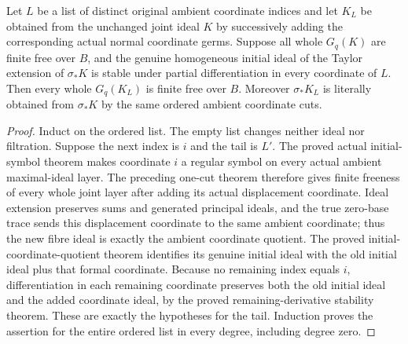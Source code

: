 \begin{theorem}
\label{hir:actual-joint-all-coordinate-cuts-free}
\leanok
{}
Let $L$ be a list of distinct original ambient coordinate indices and
let $K_L$ be obtained from the unchanged joint ideal $K$ by successively
adding the corresponding actual normal coordinate germs. Suppose all
whole $G_q(K)$ are finite free over $B$, and the genuine homogeneous
initial ideal of the Taylor extension of $\sigma_*K$ is stable under
partial differentiation in every coordinate of $L$. Then every whole
$G_q(K_L)$ is finite free over $B$. Moreover $\sigma_*K_L$ is literally
obtained from $\sigma_*K$ by the same ordered ambient coordinate cuts.
\end{theorem}
\begin{proof}
Induct on the ordered list. The empty list changes neither ideal nor
filtration. Suppose the next index is $i$ and the tail is $L'$. The
proved actual initial-symbol theorem makes coordinate $i$ a regular
symbol on every actual ambient maximal-ideal layer. The preceding
one-cut theorem therefore gives finite freeness of every whole joint
layer after adding its actual displacement coordinate. Ideal extension
preserves sums and generated principal ideals, and the true zero-base
trace sends this displacement coordinate to the same ambient coordinate;
thus the new fibre ideal is exactly the ambient coordinate quotient.
The proved initial-coordinate-quotient theorem identifies its genuine
initial ideal with the old initial ideal plus that formal coordinate.
Because no remaining index equals $i$, differentiation in each remaining
coordinate preserves both the old initial ideal and the added coordinate
ideal, by the proved remaining-derivative stability theorem. These are
exactly the hypotheses for the tail. Induction proves the assertion
for the entire ordered list in every degree, including degree zero.
\end{proof}

